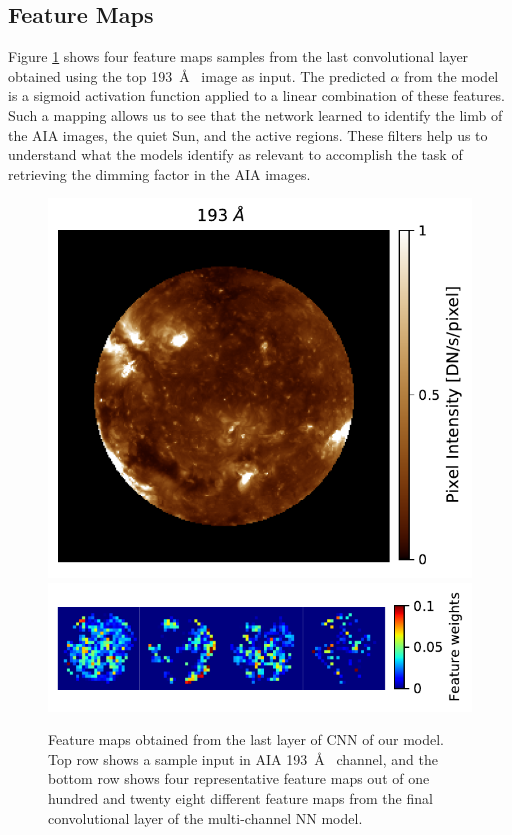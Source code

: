 \documentclass[twocolumn,usenames,dvipsnames]{aastex63}
\begin{document}
\subsection{Feature Maps}
    \label{sec:feature-maps}

Figure \ref{fig:autocalibrate_activation_viz} shows four feature maps samples from the last convolutional layer obtained using the top 193~\AA~ image as input. The predicted $\alpha$ from the model is a sigmoid activation function applied to a linear combination of these features. Such a mapping allows us to see that the network learned to identify the limb of the AIA images, the quiet Sun, and the active regions. These filters help us to understand what the models identify as relevant to accomplish the task of retrieving the dimming factor in the AIA images. 

\begin{figure} [h]
  \centering
  \includegraphics[width=0.8\linewidth]{reference.pdf}
  \includegraphics[width=\linewidth]{latent.pdf}
  \caption{Feature maps obtained from the last layer of CNN of our model. Top row shows a sample input in AIA 193~\AA~ channel, and the bottom row shows four representative feature maps out of one hundred and twenty eight different feature maps from the final convolutional layer of the multi-channel NN model.}
  \label{fig:autocalibrate_activation_viz}
\end{figure}
\end{document}
